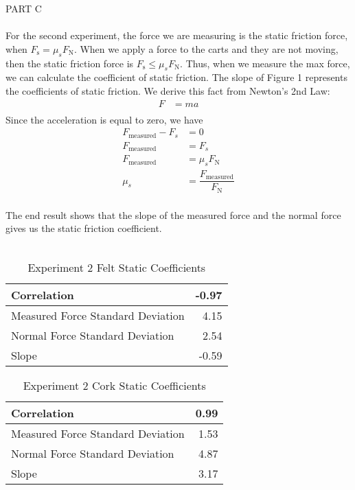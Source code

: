 \documentclass [12pt, letterpaper, twoside] {article}
\begin{document}
\noindent
PART C \\\\
For the second experiment, the force we are measuring is the static friction force, when \(F_{\text{s}} = \mu_{s}F_{\text{N}}\). When we apply a force to the carts and they are not moving, then the static friction force is \(F_{\text{s}} \leq \mu_{s}F_{\text{N}}\). Thus, when we measure the max force, we can calculate the coefficient of static friction. The slope of Figure 1 represents the coefficients of static friction. We derive this fact from Newton's 2nd Law:
\begin {equation*}
  \begin {split}
    F & = ma \\
  \end {split}
\end {equation*}
Since the acceleration is equal to zero, we have
\begin {equation*}
  \begin {split}
    F_{\text{measured}} - F_{s} & = 0 \\
    F_{\text{measured}} & = F_{s} \\
    F_{\text{measured}} & = \mu_{s}F_{\text{N}} \\
    \mu_{s} & = \dfrac{F_{\text{measured}}}{F_{\text{N}}} \\
  \end {split}
\end {equation*}
    
\noindent
The end result shows that the slope of the measured force and the normal force gives us the static friction coefficient. \\\\

\begin {table}[h]
  \centering
    \begin {tabular} {| l | r |}
      \hline\hline
      Correlation & -0.97 \\ %
      \hline
      Measured Force Standard Deviation & 4.15 \\ %
      \hline
      Normal Force Standard Deviation & 2.54 \\ %
      \hline
      Slope & -0.59 \\ %
      \hline\hline
    \end {tabular}
  \caption {Experiment 2 Felt Static Coefficients}
\end {table}
 
\begin {table}[h]
  \centering
    \begin {tabular} {| l | r |}
      \hline\hline
      Correlation & 0.99 \\ %
      \hline
      Measured Force Standard Deviation & 1.53 \\ %
      \hline
      Normal Force Standard Deviation & 4.87 \\ %
      \hline
      Slope & 3.17 \\ %
      \hline\hline
    \end {tabular}
  \caption {Experiment 2 Cork Static Coefficients}
\end {table}
\end{document}
